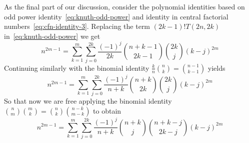 As the final part of our discussion, consider the polynomial identities based on odd power identity~\eqref{eq:knuth-odd-power}
and identity in central factorial numbers~\eqref{eq:cfn-identity-3}.
Replacing the term $(2k-1)!T(2n, 2k)$ in~\eqref{eq:knuth-odd-power} we get
\begin{equation*}
    n^{2m-1} = \sum_{k=1}^{m} \sum_{j=0}^{2k} \frac{(-1)^{j}}{2k} \binom{n+k-1}{2k-1} \binom{2k}{j} (k-j)^{2m}
\end{equation*}
Continuing similarly with the binomial identity $\frac{k}{n} \binom{n}{k} = \binom{n-1}{k-1}$ yields
\begin{equation*}
    n^{2m-1} = \sum_{k=1}^{m} \sum_{j=0}^{2k} \frac{(-1)^{j}}{n+k} \binom{n+k}{2k} \binom{2k}{j} (k-j)^{2m}
\end{equation*}
So that now we are free applying the binomial identity $\binom{n}{m} \binom{m}{k} = \binom{n}{k} \binom{n-k}{m-k}$
to obtain
\begin{equation*}
    n^{2m-1} = \sum_{k=1}^{m} \sum_{j=0}^{2k} \frac{(-1)^{j}}{n+k} \binom{n+k}{j} \binom{n+k-j}{2k-j} (k-j)^{2m}
\end{equation*}